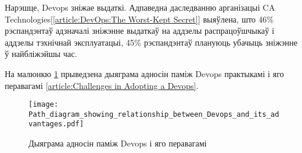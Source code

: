 Нарэшце, Devops зніжае выдаткі. Адпаведна даследванню арганізацыі
CA Technologies[\ref{article:DevOps:The Worst-Kept Secret}]
выяўлена, што 46\% рэспандэнтаў адзначалі зніжэнне выдаткаў
на аддзелы распрацоўшчыкаў і аддзелы тэхнічнай эксплуатацыі,
45\% рэспандэнтаў плануюць убачыць зніжэнне ў найбліжэйшы час.

На малюнкю 
\ref{figure:Path diagram showing relationships between Devops and its benefits}
прыведзена дыяграма адносін паміж Devops практыкамі і яго перавагамі%
\ref{article:Challenges in Adopting a Devops}.

\newpage
\begin{figure}[ht!]
    \texttt{[image: Path\_diagram\_showing\_relationship\_between\_Devops\_and\_its\_advantages.pdf]}
    \caption{Дыяграма адносін паміж Devops і яго перавагамі}
    \label{figure:Path diagram showing relationships between Devops and its benefits}
\end{figure}
%
%
%
%
%
%
%

